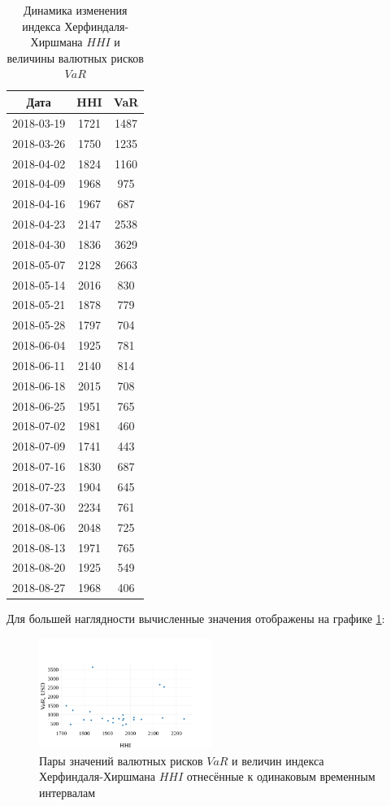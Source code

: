 \documentclass[12pt]{article}
\begin{document}
\begin{table}[H]
\centering
\begin{tabular}{ccc}
\hline
Дата       & HHI  & VaR  \\ \hline
2018-03-19 & 1721 & 1487 \\
2018-03-26 & 1750 & 1235 \\
2018-04-02 & 1824 & 1160 \\
2018-04-09 & 1968 & 975  \\
2018-04-16 & 1967 & 687  \\
2018-04-23 & 2147 & 2538 \\
2018-04-30 & 1836 & 3629 \\
2018-05-07 & 2128 & 2663 \\
2018-05-14 & 2016 & 830  \\
2018-05-21 & 1878 & 779  \\
2018-05-28 & 1797 & 704  \\
2018-06-04 & 1925 & 781  \\
2018-06-11 & 2140 & 814  \\
2018-06-18 & 2015 & 708  \\
2018-06-25 & 1951 & 765  \\
2018-07-02 & 1981 & 460  \\
2018-07-09 & 1741 & 443  \\
2018-07-16 & 1830 & 687  \\
2018-07-23 & 1904 & 645  \\
2018-07-30 & 2234 & 761  \\
2018-08-06 & 2048 & 725  \\
2018-08-13 & 1971 & 765  \\
2018-08-20 & 1925 & 549  \\
2018-08-27 & 1968 & 406  \\ \hline
\end{tabular}
\caption{Динамика изменения индекса Херфиндаля-Хиршмана $HHI$ и величины валютных рисков $VaR$}
\label{tab:thvar}
\end{table}

Для большей наглядности вычисленные значения отображены на графике \ref{img:varh}:

\begin{figure}[H]
\centering
\includegraphics[width=0.5\textwidth]{varh.png}
\caption{Пары значений валютных рисков $VaR$ и величин индекса Херфиндаля-Хиршмана $HHI$ отнесённые к одинаковым временным интервалам}
\label{img:varh}
\end{figure}
\end{document}
